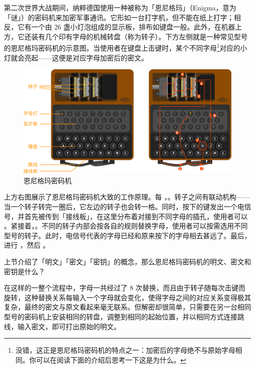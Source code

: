 第二次世界大战期间，纳粹德国使用一种被称为「恩尼格玛」（Enigma，意为「谜」）的密码机来加密军事通讯。它形如一台打字机，但不能在纸上打字；相反，它有一个由 26 盏小灯泡组成的显示板，排布如键盘一般。此外，在机器上方，它还装有几个印有字母的机械转盘（称为转子）。下方左侧就是一种常见型号的恩尼格玛密码机的示意图。当使用者在键盘上击键时，某个不同字母\footnote{没错，这正是恩尼格玛密码机的特点之一：加密后的字母绝不与原始字母相同。你可以在阅读下面的介绍后思考一下这是为什么。}对应的小灯就会亮起——这便是对应字母加密后的密文。

\begin{figure}[htb!]
  \centering
  \includegraphics[width=.9\textwidth]{assets/surpass/Enigma.pdf}
  \caption{恩尼格玛密码机}
  \label{fig:Enigma}
\end{figure}

上方右图展示了恩尼格玛密码机大致的工作原理。每 ，。转子之间有联动机构——当一个转子转完一圈后，它左边的转子也会转一格。同时，按下的键发出一个电信号，并首先被传到「接线板」，在这里分布着对接到不同字母的插孔，使用者可以 。紧接着，。不同的转子内部会按各自的规则替换字母，使用者可以按需选用不同型号的转子。此时，电信号代表的字母已经和原来按下的字母相去甚远了。最后，进行 ，然后 。

\begin{note}
  上节介绍了「明文」「密文」「密钥」的概念，那么恩尼格玛密码机的明文、密文和密钥是什么？
\end{note}

在这样的一整个流程中，字母一共经过了 8 次替换，而且由于转子随每次击键而旋转，这种替换关系每输入一个字母就会变化，使得字母之间的对应关系变得极其复杂，最终的密文与原文看起来毫无联系。但解密却很简单，只需要在另一台相同型号的密码机上安装相同的转盘，调整到相同的起始位置，并以相同方式连接跳线，输入密文，即可打出原始的明文。

